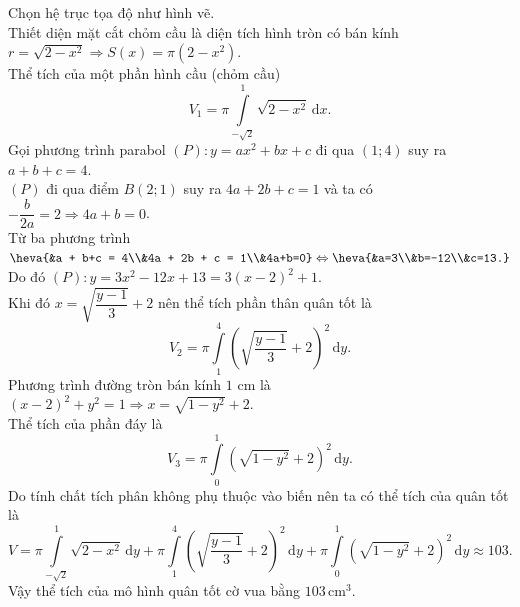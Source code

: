 \begin{ex}
{\begin{center}
\end{center}
Chọn hệ trục tọa độ như hình vẽ.\\
Thiết diện mặt cắt chỏm cầu là diện tích hình tròn có bán kính $r = \sqrt{2 - x^2} \Rightarrow S(x) = \pi\left(2 - x^2\right)$.\\
Thể tích của một phần hình cầu (chỏm cầu)
\[
V_1 =\pi \displaystyle\int\limits_{-\sqrt{2}}^{1} \sqrt{2 - x^2}\,\mathrm{d}x.
\]
Gọi phương trình parabol $(P)\colon y = ax^2 + bx + c$ đi qua $(1;4)$ suy ra $a + b+c = 4$.\\
$(P)$ đi qua điểm $B(2;1)$ suy ra $4a + 2b + c = 1$ và ta có $-\dfrac{b}{2a}=2 \Rightarrow 4a+b=0$.\\
Từ ba phương trình $\heva{&a + b+c = 4\\&4a + 2b + c = 1\\&4a+b=0}\Leftrightarrow \heva{&a=3\\&b=-12\\&c=13.}$\\
Do đó $(P)\colon y = 3x^2 - 12x + 13=3(x-2)^2+1$.\\
Khi đó $x = \sqrt{\dfrac{y - 1}{3}}+2$
nên thể tích phần thân quân tốt là
\[
V_2 = \pi\displaystyle\int\limits_{1}^{4} \left( \sqrt{\dfrac{y - 1}{3}}+2\right)^2 \,\mathrm{d}y.
\]
Phương trình đường tròn bán kính $1$ cm là $\left(x - 2\right)^2 + y^2 = 1 \Rightarrow x = \sqrt{1 -y^2}+2$.\\
Thể tích của phần đáy là
\[
V_3 = \pi\displaystyle\int\limits_{0}^{1} \left(\sqrt{1 -y^2}+2\right)^2\,\mathrm{d}y.
\]
Do tính chất tích phân không phụ thuộc vào biến nên ta có thể tích của quân tốt là
\[
V = \pi\displaystyle\int\limits_{-\sqrt{2}}^{1} \sqrt{2 - x^2}\,\mathrm{d}y + \pi\displaystyle\int\limits_{1}^{4} \left( \sqrt{\dfrac{y - 1}{3}}+2\right)^2 \,\mathrm{d}y + \pi\displaystyle\int\limits_{0}^{1} \left(\sqrt{1 -y^2}+2\right)^2 \,\mathrm{d}y \approx 103.\]
Vậy thể tích của mô hình quân tốt cờ vua bằng $103$\,cm$^3$.
}
\end{ex}

